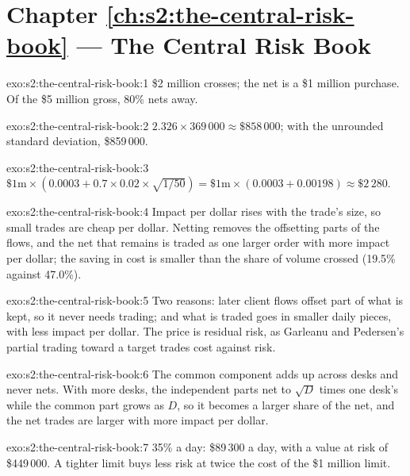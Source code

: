 \section*{Chapter \ref{ch:s2:the-central-risk-book} --- The Central Risk Book}

\begin{solution}{exo:s2:the-central-risk-book:1}
\$2 million crosses; the net is a \$1 million purchase. Of the \$5 million gross, 80\% nets away.
\end{solution}

\begin{solution}{exo:s2:the-central-risk-book:2}
$2.326 \times 369\,000 \approx \$858\,000$; with the unrounded standard deviation, \$859\,000.
\end{solution}

\begin{solution}{exo:s2:the-central-risk-book:3}
$\$1\text{m} \times (0.0003 + 0.7 \times 0.02 \times \sqrt{1/50}) = \$1\text{m} \times (0.0003 + 0.00198) \approx \$2\,280$.
\end{solution}

\begin{solution}{exo:s2:the-central-risk-book:4}
Impact per dollar rises with the trade's size, so small trades are cheap per dollar. Netting removes the offsetting parts of the flows, and the net
that remains is traded as one larger order with more impact per dollar; the saving in cost is smaller than the share of volume crossed (19.5\%
against 47.0\%).
\end{solution}

\begin{solution}{exo:s2:the-central-risk-book:5}
Two reasons: later client flows offset part of what is kept, so it never needs trading; and what is traded goes in smaller daily pieces, with less
impact per dollar. The price is residual risk, as Garleanu and Pedersen's partial trading toward a target trades cost against risk.
\end{solution}

\begin{solution}{exo:s2:the-central-risk-book:6}
The common component adds up across desks and never nets. With more desks, the independent parts net to $\sqrt D$ times one desk's while the common
part grows as $D$, so it becomes a larger share of the net, and the net trades are larger with more impact per dollar.
\end{solution}

\begin{solution}{exo:s2:the-central-risk-book:7}
35\% a day: \$89\,300 a day, with a value at risk of \$449\,000. A tighter limit buys less risk at twice the cost of the \$1 million limit.
\end{solution}

